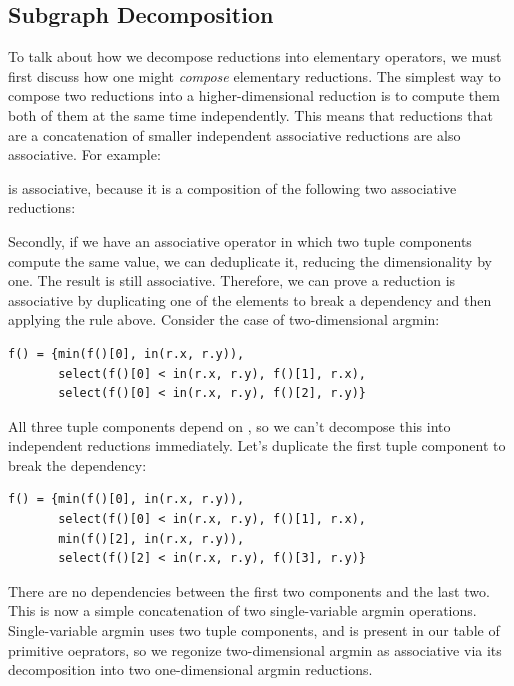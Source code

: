 \subsection{Subgraph Decomposition}
\label{subsec:decomposition}

To talk about how we decompose reductions into elementary operators, we must first discuss how one might \emph{compose} elementary reductions. The simplest way to compose two reductions into a higher-dimensional reduction is to compute them both of them at the same time independently. This means that reductions that are a concatenation of smaller independent associative reductions are also associative. For example:


is associative, because it is a composition of the following two associative reductions:



Secondly, if we have an associative operator in which two tuple components compute the same value, we can deduplicate it, reducing the dimensionality by one. The result is still associative. Therefore, we can prove a reduction is associative by duplicating one of the elements to break a dependency and then applying the rule above. Consider the case of two-dimensional argmin:

\begin{lstlisting}[caption={Two-dimensional argmin. The three tuple components are the minimum value, and its x and y coordinates.}]
f() = {min(f()[0], in(r.x, r.y)),
       select(f()[0] < in(r.x, r.y), f()[1], r.x),
       select(f()[0] < in(r.x, r.y), f()[2], r.y)}
\end{lstlisting}

All three tuple components depend on , so we can't decompose this into independent reductions immediately. Let's duplicate the first tuple component to break the dependency:

\begin{lstlisting}[caption={Two-dimensional argmin with the minimum value redundantly computed as \code{f()[0]} and \code{f()[2]}}]
f() = {min(f()[0], in(r.x, r.y)),
       select(f()[0] < in(r.x, r.y), f()[1], r.x),
       min(f()[2], in(r.x, r.y)),
       select(f()[2] < in(r.x, r.y), f()[3], r.y)}
\end{lstlisting}

There are no dependencies between the first two components and the last two. This is now a simple concatenation of two single-variable argmin operations. Single-variable argmin uses two tuple components, and is present in our table of primitive oeprators, so we regonize two-dimensional argmin as associative via its decomposition into two one-dimensional argmin reductions.

